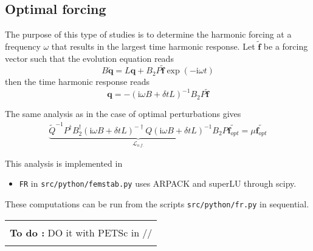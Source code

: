 \documentclass[12pts]{article}%
\def\v{\bm}
\def\i{\text{i}}
\def\wt{\widetilde}
\def\h{^\dagger}
\newenvironment{TODO}{\vspace{.25cm}\begin{center}\begin{tabular}{|p{.75\linewidth}|} \hline\\ \textbf{To do :}}
{ \\ \\\hline \end{tabular}\end{center}\vspace{.25cm}}
\begin{document}
\subsection{Optimal forcing}

The purpose of this type of studies is to determine the harmonic
forcing at a frequency $\omega$ that results in the largest time
harmonic response. Let $\wt{\v f}$ be a forcing vector such that the evolution equation reads
\begin{equation*}
  B\dot{\v q} = L\v q + B_2P\wt{\v{f}}\exp(-\i\omega t) 
\end{equation*}
then the time harmonic response reads
\begin{equation*}
  \v q = -( \i\omega B + \delta t L)^{-1}B_2P\wt{\v{f}} 
\end{equation*}

The same analysis as in the case of optimal perturbations gives
\begin{align*}
  \underbrace{\wt{Q}^{-1} P\h B_2\h ( \i\omega B + \delta t
    L)^{-\dagger} Q ( \i\omega B + \delta t L)^{-1} B_2 P}_{\mathcal
    L_{o.f.}}\wt{\v{f}_{opt}} = \mu \wt{\v{f}_{opt}}
\end{align*} 

This analysis is implemented in
\begin{itemize}
\item \texttt{FR} in \texttt{src/python/femstab.py} uses ARPACK
  and superLU through scipy.
\end{itemize}
These computations can be run from the scripts
\texttt{src/python/fr.py} in sequential.

\begin{TODO}
  DO it with PETSc in //
\end{TODO}
\end{document}
